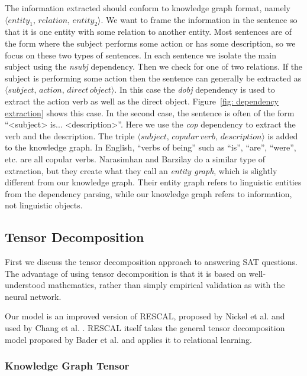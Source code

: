 \documentclass[pageno]{final_paper}
\begin{document}
The information extracted should conform to knowledge graph format, namely
\\$\langle entity_1, \,relation, \,entity_2 \rangle$. We want to frame the
information in the sentence so that it is one entity with some relation to
another entity. Most sentences are of the form where the subject performs some
action or has some description, so we focus on these two types of sentences. In
each sentence we isolate the main subject using the \textit{nsubj} dependency.
Then we check for one of two relations. If the subject is performing some action
then the sentence can generally be extracted as $\langle subject, \,action,
\,direct\,object \rangle$. In this case the \textit{dobj} dependency is used to
extract the action verb as well as the direct object. Figure~\ref{fig:
dependency extraction} shows this case. In the second case, the sentence is
often of the form ``<subject> is... <description>''. Here we use the
\textit{cop} dependency to extract the verb and the description. The triple
$\langle subject, \,copular\,verb, \,description \rangle$ is added to the
knowledge graph. In English, ``verbs of being'' such as ``is'', ``are'',
``were'', etc. are all copular verbs. Narasimhan and Barzilay
\cite{Narasimhan2015} do a similar type of extraction, but they create what they
call an \textit{entity graph}, which is slightly different from our knowledge
graph. Their entity graph refers to linguistic entities from the dependency
parsing, while our knowledge graph refers to information, not linguistic
objects.

\subsection{Tensor Decomposition}
\label{Tensor Decomposition}

First we discuss the tensor decomposition approach to answering SAT questions.
The advantage of using tensor decomposition is that it is based on
well-understood mathematics, rather than simply empirical validation as with the
neural network.

Our model is an improved version of RESCAL, proposed by Nickel et al.
\cite{Nickel2011} and used by Chang et al. \cite{Chang2014}. RESCAL itself takes
the general tensor decomposition model proposed by Bader et al. \cite{Bader2007}
and applies it to relational learning.

\subsubsection{Knowledge Graph Tensor}
\label{Knowledge Graph Tensor}
\end{document}
